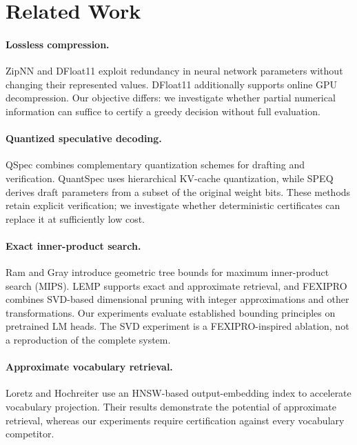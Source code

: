 \section{Related Work}
\label{sec:related-work}

\paragraph{Lossless compression.}
ZipNN \cite{hershcovitch2025zipnn} and DFloat11 \cite{zhang2025dfloat11} exploit redundancy in neural network parameters without changing their represented values. DFloat11 additionally supports online GPU decompression. Our objective differs: we investigate whether partial numerical information can suffice to certify a greedy decision without full evaluation.

\paragraph{Quantized speculative decoding.}
QSpec \cite{zhao2025qspec} combines complementary quantization schemes for drafting and verification. QuantSpec \cite{tiwari2025quantspec} uses hierarchical KV-cache quantization, while SPEQ \cite{zhao2025speq} derives draft parameters from a subset of the original weight bits. These methods retain explicit verification; we investigate whether deterministic certificates can replace it at sufficiently low cost.

\paragraph{Exact inner-product search.}
Ram and Gray \cite{ram2012mips} introduce geometric tree bounds for maximum inner-product search (MIPS). LEMP \cite{teflioudi2017lemp} supports exact and approximate retrieval, and FEXIPRO \cite{li2017fexipro} combines SVD-based dimensional pruning with integer approximations and other transformations. Our experiments evaluate established bounding principles on pretrained LM heads. The SVD experiment is a FEXIPRO-inspired ablation, not a reproduction of the complete system.

\paragraph{Approximate vocabulary retrieval.}
Loretz and Hochreiter \cite{loretz2026output} use an HNSW-based output-embedding index to accelerate vocabulary projection. Their results demonstrate the potential of approximate retrieval, whereas our experiments require certification against every vocabulary competitor.

